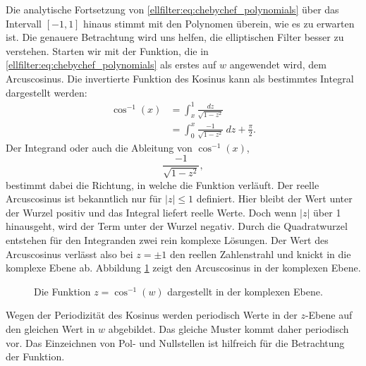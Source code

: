 Die analytische Fortsetzung von \eqref{ellfilter:eq:chebychef_polynomials} über das Intervall $[-1,1]$ hinaus stimmt mit den Polynomen überein, wie es zu erwarten ist.
Die genauere Betrachtung wird uns helfen, die elliptischen Filter besser zu verstehen.
Starten wir mit der Funktion, die in \eqref{ellfilter:eq:chebychef_polynomials} als erstes auf $w$ angewendet wird, dem Arcuscosinus.
Die invertierte Funktion des Kosinus kann als bestimmtes Integral dargestellt werden:
\begin{align}
    \cos^{-1}(x)
    &=
    \int_{x}^{1}
    \frac{
        dz
    }{
        \sqrt{
            1-z^2
        }
    }\\
    &=
    \int_{0}^{x}
    \frac{
        -1
    }{
        \sqrt{
            1-z^2
        }
    }
    ~dz
    + \frac{\pi}{2}.
\end{align}
Der Integrand oder auch die Ableitung von $\cos^{-1}(x)$,
\begin{equation}
    \frac{
        -1
    }{
        \sqrt{
            1-z^2
        }
    },
\end{equation}
bestimmt dabei die Richtung, in welche die Funktion verläuft.
Der reelle Arcuscosinus ist bekanntlich nur für $|z| \leq 1$ definiert.
Hier bleibt der Wert unter der Wurzel positiv und das Integral liefert reelle Werte.
Doch wenn $|z|$ über 1 hinausgeht, wird der Term unter der Wurzel negativ.
Durch die Quadratwurzel entstehen für den Integranden zwei rein komplexe Lösungen.
Der Wert des Arcuscosinus verlässt also bei $z= \pm 1$ den reellen Zahlenstrahl und knickt in die komplexe Ebene ab.
Abbildung \ref{ellfilter:fig:arccos} zeigt den Arcuscosinus in der komplexen Ebene.
\begin{figure}
    \centering
    
    \caption{Die Funktion $z = \cos^{-1}(w)$ dargestellt in der komplexen Ebene.}
    \label{ellfilter:fig:arccos}
\end{figure}
Wegen der Periodizität des Kosinus werden periodisch Werte in der $z$-Ebene auf den gleichen Wert in $w$ abgebildet.
Das gleiche Muster kommt daher periodisch vor.
Das Einzeichnen von Pol- und Nullstellen ist hilfreich für die Betrachtung der Funktion.


